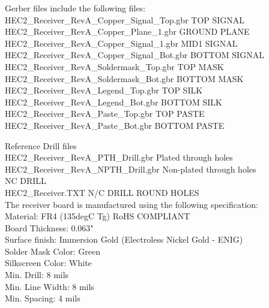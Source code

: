 \documentclass[12pt]{article}
\begin{document}
\noindent
Gerber files include the following files:\\
HEC2\_Receiver\_RevA\_Copper\_Signal\_Top.gbr          	\indent\space	TOP SIGNAL\\
HEC2\_Receiver\_RevA\_Copper\_Plane\_1.gbr               	\indent\indent\space	GROUND PLANE\\
HEC2\_Receiver\_RevA\_Copper\_Signal\_1.gbr  	        	\indent\indent	MID1 SIGNAL\\
HEC2\_Receiver\_RevA\_Copper\_Signal\_Bot.gbr           	\indent\space	BOTTOM SIGNAL\\
HEC2\_Receiver\_RevA\_Soldermask\_Top.gbr  	        	\indent\indent	TOP MASK\\
HEC2\_Receiver\_RevA\_Soldermask\_Bot.gbr   	        	\indent\indent	BOTTOM MASK\\
HEC2\_Receiver\_RevA\_Legend\_Top.gbr          	        	\indent\indent\indent\space	TOP SILK\\
HEC2\_Receiver\_RevA\_Legend\_Bot.gbr           	        	\indent\indent\indent\space	BOTTOM SILK\\
HEC2\_Receiver\_RevA\_Paste\_Top.gbr             	        	\indent\indent\indent\space\space\space	TOP PASTE\\
HEC2\_Receiver\_RevA\_Paste\_Bot.gbr             	        	\indent\indent\indent\space\space\space	BOTTOM PASTE

\hfill
\pagebreak
\hfill 

\noindent
Reference Drill files\\
HEC2\_Receiver\_RevA\_PTH\_Drill.gbr              	        	\indent\indent\indent\space\space	Plated through holes\\
HEC2\_Receiver\_RevA\_NPTH\_Drill.gbr            	        	\indent\indent\indent	Non-plated through holes\\
 
 \noindent
NC DRILL\\
HEC2\_Receiver.TXT         	        	\indent\indent\indent	N/C DRILL ROUND HOLES\\
 
 \noindent
The receiver board is manufactured using the following specification:\\
 
 \noindent
Material: FR4 (135degC Tg) RoHS COMPLIANT\\
Board Thickness: 0.063"\\
Surface finish: Immersion Gold (Electroless Nickel Gold - ENIG)\\
Solder Mask Color: Green\\
Silkscreen Color: White\\
Min. Drill: 8 mils\\
Min. Line Width: 8 mils\\
Min. Spacing: 4 mils\\
 
\end{document}
